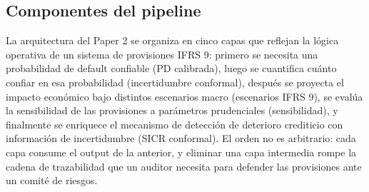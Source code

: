 \documentclass[
  spanish,
  11pt,
  letterpaper,
]{scrbook}
\theoremstyle{plain}
\theoremstyle{remark}
\begin{document}
\subsection{Componentes del pipeline}\label{componentes-del-pipeline}

La arquitectura del Paper 2 se organiza en cinco capas que reflejan la
lógica operativa de un sistema de provisiones IFRS 9: primero se
necesita una probabilidad de default confiable (PD calibrada), luego se
cuantifica cuánto confiar en esa probabilidad (incertidumbre conformal),
después se proyecta el impacto económico bajo distintos escenarios macro
(escenarios IFRS 9), se evalúa la sensibilidad de las provisiones a
parámetros prudenciales (sensibilidad), y finalmente se enriquece el
mecanismo de detección de deterioro crediticio con información de
incertidumbre (SICR conformal). El orden no es arbitrario: cada capa
consume el output de la anterior, y eliminar una capa intermedia rompe
la cadena de trazabilidad que un auditor necesita para defender las
provisiones ante un comité de riesgos.
\end{document}
